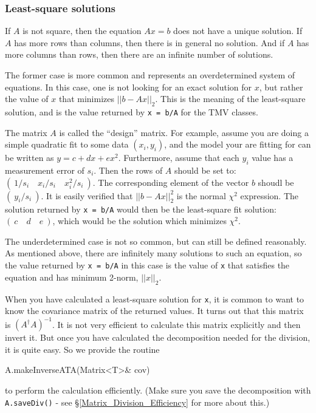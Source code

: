 \documentclass[twoside,letterpaper,11pt]{article}
\renewcommand{\tt}[1]{{\lstinline {#1}}}
\begin{document}
\subsubsection{Least-square solutions}
\label{Matrix_Division_Leastsquare}

If $A$ is not square, then the equation $A x = b$ does not have a unique solution.
If $A$ has more rows than columns, then there is in general no solution.
And if $A$ has more columns than rows, then there are an infinite 
number of solutions.  

The former case is more common and represents an overdetermined system of 
equations.  In this case, one is not looking for an exact solution
for $x$, but rather the value of $x$ that minimizes $||b - A x||_2$.  This is the 
meaning of the least-square
solution, and is the value returned by \tt{x = b/A} for the TMV classes.  

The matrix $A$ is called the ``design'' matrix.  For example, assume you are doing
a simple quadratic fit to some data $(x_i,y_i)$, and the model your are fitting for
can be written as
$y = c + dx + ex^2$.  Furthermore, assume that each
$y_i$ value has a measurement error of $s_i$.  Then the rows of $A$ should
be set to: $( ~1/s_i \quad x_i/s_i \quad x_i^2/s_i ~ )$.  The corresponding
element of the vector $b$ shoudl be $( ~ y_i/s_i ~ )$.  It is easily verified that
$||b-Ax||_2^2$ is the normal $\chi^2$ expression.
The solution returned by
\tt{x = b/A} would then be the least-square fit solution: $(~c \quad d \quad e~)$,
which would be the solution which minimizes $\chi^2$.

The underdetermined case is not so common, but can still be defined reasonably.  
As mentioned above, there are infinitely many solutions to such an equation, so the
value returned by \tt{x = b/A} in this case is the value of \tt{x} that satisfies the 
equation and has minimum 2-norm, $||x||_2$.

When you have calculated a least-square solution for \tt{x}, it is common to want 
to know the covariance matrix of the returned values.  It turns out that this
matrix is $(A^\dagger A)^{-1}$.  It is not very efficient to calculate this matrix
explicitly and then invert it.  But once you have calculated the decomposition
needed for the division, it is quite easy.  So we provide the routine 
\begin{tmvcode}
A.makeInverseATA(Matrix<T>& cov)
\end{tmvcode}
to perform the calculation efficiently.  (Make sure you save the decomposition with 
\tt{A.saveDiv()} - see \S\ref{Matrix_Division_Efficiency} for more about this.)
\end{document}
